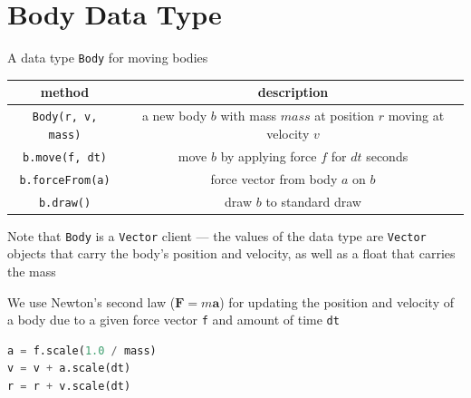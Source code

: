 \documentclass[8pt,a4paper,compress]{beamer}
\begin{document}
\section{Body Data Type}
\begin{frame}[fragile]
\pause

A data type \lstinline{Body} for moving bodies
\begin{center}
\begin{tabular}{cc}
method & description \\ \hline
\lstinline$Body(r, v, mass)$ & a new body $b$ with mass $mass$ at position $r$ moving at velocity $v$ \\
\lstinline$b.move(f, dt)$ & move $b$ by applying force $f$ for $dt$ seconds \\
\lstinline$b.forceFrom(a)$ & force vector from body $a$ on $b$ \\
\lstinline$b.draw()$ & draw $b$ to standard draw
\end{tabular} 
\end{center}

\pause
\bigskip

Note that \lstinline{Body} is a \lstinline{Vector} client --- the values of the data type are \lstinline{Vector} objects that carry the body's position and velocity, as well as a float that carries the mass

\pause
\bigskip

We use Newton's second law ($\mathbf{F}=m\mathbf{a}$) for updating the position and velocity of a body due to a given force vector \lstinline{f} and amount of time \lstinline{dt}
\begin{lstlisting}[language=python,style=focusin]
a = f.scale(1.0 / mass)
v = v + a.scale(dt)
r = r + v.scale(dt)
\end{lstlisting}

\begin{center}
\end{center}
\end{frame}
\end{document}
